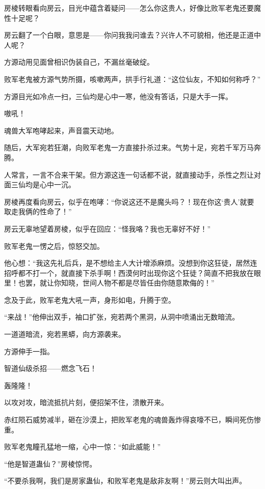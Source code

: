 \begin{this_body}
房棱转眼看向房云，目光中蕴含着疑问——怎么你这贵人，好像比败军老鬼还要魔性十足呢？

房云翻了一个白眼，意思是——你问我我问谁去？兴许人不可貌相，他还是正道中人呢？

方源动用见面曾相识伪装自己，不漏丝毫破绽。

败军老鬼被方源气势所摄，咳嗽两声，拱手行礼道：“这位仙友，不知如何称呼？”

方源目光如冷点一扫，三仙均是心中一寒，他没有答话，只是大手一挥。

嗷吼！

魂兽大军咆哮起来，声音震天动地。

随后，大军宛若狂潮，向败军老鬼一方直接扑杀过来。气势十足，宛若千军万马奔腾。

人常言，一言不合来干架。但方源这连一句话都不说，就直接动手，杀性之烈让对面三仙均是心中一沉。

房棱再度看向房云，似乎在咆哮：“你说这还不是魔头吗？！现在你这‘贵人’就要取走我俩的性命了！”

房云无辜地望着房棱，似乎在回应：“怪我咯？我也无辜好不好！”

败军老鬼一愣之后，惊怒交加。

他心想：“我这先礼后兵，是不想给主人大计增添麻烦。没想到你这狂徒，居然连招呼都不打一个，就直接下杀手啊！西漠何时出现你这个狂徒？简直不把我放在眼里！也罢，就让你知晓，世间人物不都是尽皆任由你随意欺侮的！”

念及于此，败军老鬼大吼一声，身形如电，升腾于空。

“来战！”他伸出双手，袖口扩张，宛若两个黑洞，从洞中喷涌出无数暗流。

一道道暗流，宛若黑蟒，向方源袭来。

方源伸手一指。

智道仙级杀招——燃念飞石！

轰隆隆！

以攻对攻，暗流抵抗片刻，便招架不住，溃散开来。

赤红陨石威势减半，砸在沙漠上，把败军老鬼的魂兽轰炸得哀嚎不已，瞬间死伤惨重。

败军老鬼瞳孔猛地一缩，心中一惊：“如此威能！”

“他是智道蛊仙？”房棱惊愕。

“不要杀我啊，我们是房家蛊仙，和败军老鬼是敌非友啊！”房云则大叫出声。

\end{this_body}

